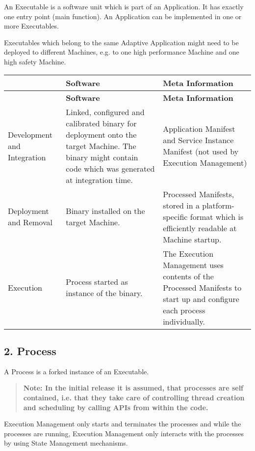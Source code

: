 \begin{DoxyItemize}
\item An Executable is a software unit which is part of an Application. It has exactly one entry point (main function). An Application can be implemented in one or more Executables.
\item Executables which belong to the same Adaptive Application might need to be deployed to different Machines, e.\+g. to one high performance Machine and one high safety Machine.
\end{DoxyItemize}

\tabulinesep=1mm
\begin{longtabu} spread 0pt [c]{*3{|X[-1]}|}
\hline
{}&{\bf Software }&{\bf Meta Information  }\\
\endfirsthead
\hline
\endfoot
\hline
{}&{\bf Software }&{\bf Meta Information  }\\
\endhead
Development and Integration &Linked, configured and calibrated binary for deployment onto the target Machine. The binary might contain code which was generated at integration time. &Application Manifest and Service Instance Manifest (not used by Execution Management) \\
Deployment and Removal &Binary installed on the target Machine. &Processed Manifests, stored in a platform-\/specific format which is efficiently readable at Machine startup. \\
Execution &Process started as instance of the binary. &The Execution Management uses contents of the Processed Manifests to start up and configure each process individually. \\
\end{longtabu}




\subsection*{2. {\bfseries Process}}


\begin{DoxyItemize}
\item A Process is a forked instance of an Executable. \begin{quote}
{\bfseries Note\+: In the initial release it is assumed, that processes are self contained, i.\+e. that they take care of controlling thread creation and scheduling by calling A\+P\+Is from within the code.} \end{quote}

\item Execution Management only starts and terminates the processes and while the processes are running, Execution Management only interacts with the processes by using State Management mechanisms.
\end{DoxyItemize}

